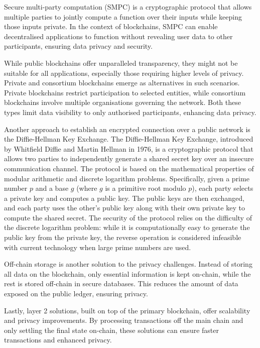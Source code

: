 Secure multi-party computation (SMPC) is a cryptographic protocol that allows multiple parties to jointly compute a function over their inputs while keeping those inputs private. In the context of blockchains, SMPC can enable decentralised applications to function without revealing user data to other participants, ensuring data privacy and security.

While public blockchains offer unparalleled transparency, they might not be suitable for all applications, especially those requiring higher levels of privacy. Private and consortium blockchains emerge as alternatives in such scenarios. Private blockchains restrict participation to selected entities, while consortium blockchains involve multiple organisations governing the network. Both these types limit data visibility to only authorised participants, enhancing data privacy.

Another approach to establish  an encrypted connection over a public network is the Diffie-Hellman Key Exchange. The Diffie-Hellman Key Exchange, introduced by Whitfield Diffie and Martin Hellman in 1976, is a cryptographic protocol that allows two parties to independently generate a shared secret key over an insecure communication channel. The protocol is based on the mathematical properties of modular arithmetic and discrete logarithm problems. Specifically, given a prime number \( p \) and a base \( g \) (where \( g \) is a primitive root modulo \( p \)), each party selects a private key and computes a public key. The public keys are then exchanged, and each party uses the other's public key along with their own private key to compute the shared secret. The security of the protocol relies on the difficulty of the discrete logarithm problem: while it is computationally easy to generate the public key from the private key, the reverse operation is considered infeasible with current technology when large prime numbers are used.

Off-chain storage is another solution to the privacy challenges. Instead of storing all data on the blockchain, only essential information is kept on-chain, while the rest is stored off-chain in secure databases. This reduces the amount of data exposed on the public ledger, ensuring privacy.

Lastly, layer 2 solutions, built on top of the primary blockchain, offer scalability and privacy improvements. By processing transactions off the main chain and only settling the final state on-chain, these solutions can ensure faster transactions and enhanced privacy.

